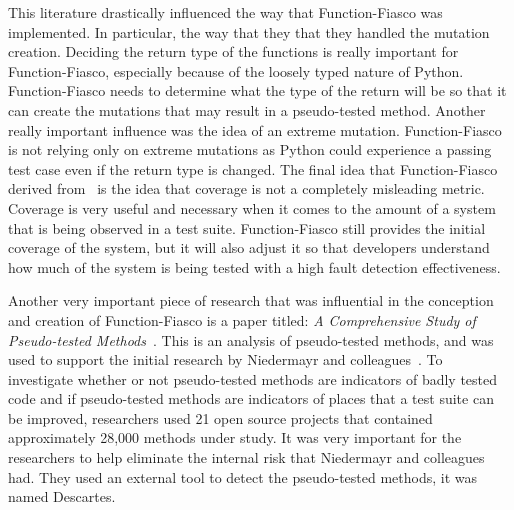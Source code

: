 This literature drastically influenced the way that Function-Fiasco was implemented. In particular, the way that they that they handled the mutation creation. Deciding the return type of the functions is really important for Function-Fiasco, especially because of the loosely typed nature of Python. Function-Fiasco needs to determine what the type of the return will be so that it can create the mutations that may result in a pseudo-tested method. Another really important influence was the idea of an extreme mutation. Function-Fiasco is not relying only on extreme mutations as Python could experience a passing test case even if the return type is changed. The final idea that Function-Fiasco derived from~\cite{niedermayr2016will} is the idea that coverage is not a completely misleading metric. Coverage is very useful and necessary when it comes to the amount of a system that is being observed in a test suite. Function-Fiasco still provides the initial coverage of the system, but it will also adjust it so that developers understand how much of the system is being tested with a high fault detection effectiveness.

Another very important piece of research that was influential in the conception and creation of Function-Fiasco is a paper titled: \textit{A Comprehensive Study of Pseudo-tested Methods}~\cite{vera2017comprehensive}. This is an analysis of pseudo-tested methods, and was used to support the initial research by Niedermayr and colleagues~\cite{niedermayr2016will}. To investigate whether or not pseudo-tested methods are indicators of badly tested code and if pseudo-tested methods are indicators of places that a test suite can be improved, researchers used 21 open source projects that contained approximately 28,000 methods under study. It was very important for the researchers to help eliminate the internal risk that Niedermayr and colleagues~\cite{niedermayr2016will} had. They used an external tool to detect the pseudo-tested methods, it was named Descartes.


